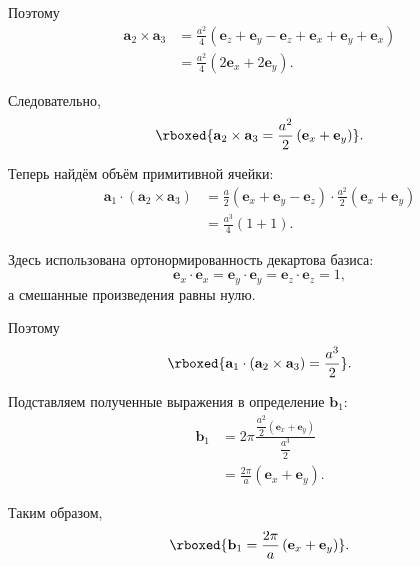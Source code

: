 \documentclass[../final.tex]{subfiles}
\begin{document}
Поэтому
%
\begin{align*}
    \mathbf a_2\times\mathbf a_3
    &=
    \frac{a^2}{4}
    \left(
        \mathbf e_z
        +
        \mathbf e_y
        -
        \mathbf e_z
        +
        \mathbf e_x
        +
        \mathbf e_y
        +
        \mathbf e_x
    \right)
    \\
    &=
    \frac{a^2}{4}
    \left(
        2\mathbf e_x+2\mathbf e_y
    \right).
\end{align*}

Следовательно,
%
\begin{equation*}
    \rboxed{
        \mathbf a_2\times\mathbf a_3
        =
        \frac{a^2}{2}
        \left(
            \mathbf e_x+\mathbf e_y
        \right)
    }.
\end{equation*}

Теперь найдём объём примитивной ячейки:
%
\begin{align*}
    \mathbf a_1\cdot
    (\mathbf a_2\times\mathbf a_3)
    &=
    \frac{a}{2}
    \left(
        \mathbf e_x+\mathbf e_y-\mathbf e_z
    \right)
    \cdot
    \frac{a^2}{2}
    \left(
        \mathbf e_x+\mathbf e_y
    \right)
    \\
    &=
    \frac{a^3}{4}
    (1+1).
\end{align*}

Здесь использована ортонормированность декартова базиса:
%
\begin{equation*}
    \mathbf e_x\cdot\mathbf e_x
    =
    \mathbf e_y\cdot\mathbf e_y
    =
    \mathbf e_z\cdot\mathbf e_z
    =
    1,
\end{equation*}
%
а смешанные произведения равны нулю.

Поэтому
%
\begin{equation*}
    \rboxed{
        \mathbf a_1\cdot
        (\mathbf a_2\times\mathbf a_3)
        =
        \frac{a^3}{2}
    }.
\end{equation*}

Подставляем полученные выражения в определение $\mathbf b_1$:
%
\begin{align*}
    \mathbf b_1
    &=
    2\pi
    \frac{
        \dfrac{a^2}{2}
        (\mathbf e_x+\mathbf e_y)
    }{
        \dfrac{a^3}{2}
    }
    \\
    &=
    \frac{2\pi}{a}
    (\mathbf e_x+\mathbf e_y).
\end{align*}

Таким образом,
%
\begin{equation*}
    \rboxed{
        \mathbf b_1
        =
        \frac{2\pi}{a}
        \left(
            \mathbf e_x+\mathbf e_y
        \right)
    }.
\end{equation*}
\end{document}
